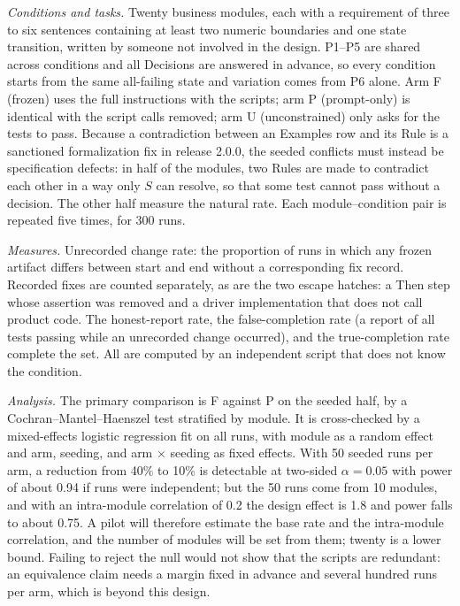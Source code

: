 \documentclass[conference]{IEEEtran}
\begin{document}
\emph{Conditions and tasks.} Twenty business modules, each with a requirement of three to six sentences containing at least two numeric boundaries and one state transition, written by someone not involved in the design. P1--P5 are shared across conditions and all Decisions are answered in advance, so every condition starts from the same all-failing state and variation comes from P6 alone. Arm F (frozen) uses the full instructions with the scripts; arm P (prompt-only) is identical with the script calls removed; arm U (unconstrained) only asks for the tests to pass. Because a contradiction between an Examples row and its Rule is a sanctioned formalization fix in release 2.0.0, the seeded conflicts must instead be specification defects: in half of the modules, two Rules are made to contradict each other in a way only $S$ can resolve, so that some test cannot pass without a decision. The other half measure the natural rate. Each module--condition pair is repeated five times, for 300 runs.

\emph{Measures.} Unrecorded change rate: the proportion of runs in which any frozen artifact differs between start and end without a corresponding fix record. Recorded fixes are counted separately, as are the two escape hatches: a Then step whose assertion was removed and a driver implementation that does not call product code. The honest-report rate, the false-completion rate (a report of all tests passing while an unrecorded change occurred), and the true-completion rate complete the set. All are computed by an independent script that does not know the condition.

\emph{Analysis.} The primary comparison is F against P on the seeded half, by a Cochran--Mantel--Haenszel test stratified by module. It is cross-checked by a mixed-effects logistic regression fit on all runs, with module as a random effect and arm, seeding, and arm $\times$ seeding as fixed effects. With 50 seeded runs per arm, a reduction from 40\% to 10\% is detectable at two-sided $\alpha = 0.05$ with power of about 0.94 if runs were independent; but the 50 runs come from 10 modules, and with an intra-module correlation of 0.2 the design effect is 1.8 and power falls to about 0.75. A pilot will therefore estimate the base rate and the intra-module correlation, and the number of modules will be set from them; twenty is a lower bound. Failing to reject the null would not show that the scripts are redundant: an equivalence claim needs a margin fixed in advance and several hundred runs per arm, which is beyond this design.
\end{document}
